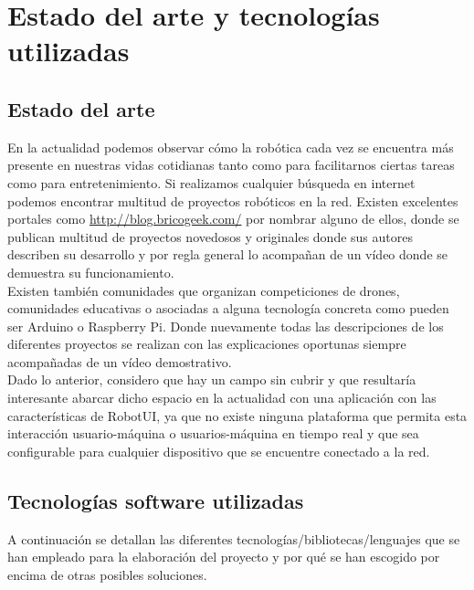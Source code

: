 
\chapter[Herramientas utilizadas]{Estado del arte y tecnologías utilizadas}
\label{chap:herramientas}


\section{Estado del arte}

En la actualidad podemos observar cómo la robótica cada vez se encuentra más presente en nuestras vidas cotidianas tanto como para facilitarnos ciertas tareas como para entretenimiento. Si realizamos 
cualquier búsqueda en internet podemos encontrar multitud de proyectos robóticos en la red. Existen excelentes portales como \url{http://blog.bricogeek.com/} por nombrar alguno de ellos, donde se
publican multitud de proyectos novedosos y originales donde sus autores describen su desarrollo y por regla general lo acompañan de un vídeo donde se demuestra su funcionamiento.\\

Existen también comunidades que organizan competiciones de drones, comunidades educativas o asociadas a alguna tecnología concreta como pueden ser Arduino o Raspberry Pi. Donde nuevamente todas las 
descripciones de los diferentes proyectos se realizan con las explicaciones oportunas siempre acompañadas de un vídeo demostrativo.\\


Dado lo anterior, considero que hay un campo sin cubrir y que resultaría interesante abarcar dicho espacio en la actualidad con una aplicación con las características de RobotUI, ya que no existe
ninguna plataforma que permita esta interacción usuario-máquina o usuarios-máquina en tiempo real y que sea configurable para cualquier dispositivo que se encuentre conectado a la red.\\



\section{Tecnologías software utilizadas}


A continuación se detallan las diferentes tecnologías/bibliotecas/lenguajes que se han empleado para la elaboración del proyecto y por qué se han escogido por encima de otras posibles soluciones.


